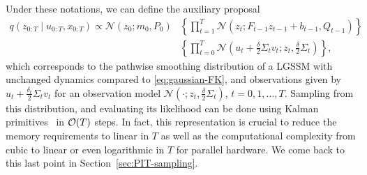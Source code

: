 Under these notations, we can define the auxiliary proposal
\begin{equation}
    \label{eq:gaussian-FK-proposal}
    \begin{split}
        q(z_{0:T} \mid u_{0:T}, x_{0:T}) \propto \mathcal{N}(z_0; m_0, P_0)
        &\left\{\prod_{t=1}^T \mathcal{N}(z_t; F_{t-1}z_{t-1} + b_{t-1}, Q_{t-1})\right\} \\
        &\left\{\prod_{t=0}^T\mathcal{N}\left(u_{t} + \frac{\delta}{2} \Sigma_t v_{t}; z_{t}, \frac{\delta}{2} \Sigma_t\right)\right\},
    \end{split}
\end{equation}
which corresponds to the pathwise smoothing distribution of a LGSSM with unchanged dynamics compared to \eqref{eq:gaussian-FK}, and observations given by $u_{t} + \frac{\delta_t}{2} \Sigma_t v_{t}$ for an observation model $\mathcal{N}\left(\cdot; z_{t}, \frac{\delta}{2} \Sigma_t\right)$, $t=0, 1, \ldots, T$.
Sampling from this distribution, and evaluating its likelihood can be done using Kalman primitives~\citep[see, e.g.][Ch. 4 and Ch. 8]{sarkka2013bayesian} in $\mathcal{O}(T)$ steps.
In fact, this representation is crucial to reduce the memory requirements to linear in $T$ as well as the computational complexity from cubic to linear or even logarithmic in $T$ for parallel hardware. We come back to this last point in Section~\ref{sec:PIT-sampling}.

